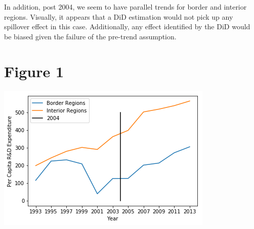 \documentclass{article}
\begin{document}
In addition, post 2004, we seem to have parallel trends for border and interior regions. Visually, it appears that a DiD estimation would not pick up any spillover effect in this case. Additionally, any effect identified by the DiD would be biased given the failure of the pre-trend assumption.
\newpage
\section*{Figure 1}
\includegraphics[scale = .65]{Plot}
\end{document}
